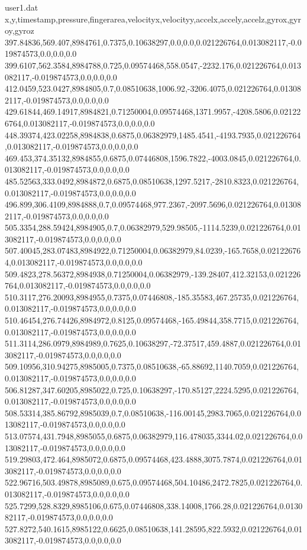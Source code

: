 \begin{filecontents}{user1.dat}
x,y,timestamp,pressure,fingerarea,velocityx,velocityy,accelx,accely,accelz,gyrox,gyroy,gyroz
397.84836,569.407,8984761,0.7375,0.10638297,0.0,0.0,0.021226764,0.013082117,-0.019874573,0.0,0.0,0.0
399.6107,562.3584,8984788,0.725,0.09574468,558.0547,-2232.176,0.021226764,0.013082117,-0.019874573,0.0,0.0,0.0
412.0459,523.0427,8984805,0.7,0.08510638,1006.92,-3206.4075,0.021226764,0.013082117,-0.019874573,0.0,0.0,0.0
429.61844,469.14917,8984821,0.71250004,0.09574468,1371.9957,-4208.5806,0.021226764,0.013082117,-0.019874573,0.0,0.0,0.0
448.39374,423.02258,8984838,0.6875,0.06382979,1485.4541,-4193.7935,0.021226764,0.013082117,-0.019874573,0.0,0.0,0.0
469.453,374.35132,8984855,0.6875,0.07446808,1596.7822,-4003.0845,0.021226764,0.013082117,-0.019874573,0.0,0.0,0.0
485.52563,333.0492,8984872,0.6875,0.08510638,1297.5217,-2810.8323,0.021226764,0.013082117,-0.019874573,0.0,0.0,0.0
496.899,306.4109,8984888,0.7,0.09574468,977.2367,-2097.5696,0.021226764,0.013082117,-0.019874573,0.0,0.0,0.0
505.3354,288.59424,8984905,0.7,0.06382979,529.98505,-1114.5239,0.021226764,0.013082117,-0.019874573,0.0,0.0,0.0
507.40045,283.07483,8984922,0.71250004,0.06382979,84.0239,-165.7658,0.021226764,0.013082117,-0.019874573,0.0,0.0,0.0
509.4823,278.56372,8984938,0.71250004,0.06382979,-139.28407,412.32153,0.021226764,0.013082117,-0.019874573,0.0,0.0,0.0
510.3117,276.20093,8984955,0.7375,0.07446808,-185.35583,467.25735,0.021226764,0.013082117,-0.019874573,0.0,0.0,0.0
510.46454,276.74426,8984972,0.8125,0.09574468,-165.49844,358.7715,0.021226764,0.013082117,-0.019874573,0.0,0.0,0.0
511.3114,286.0979,8984989,0.7625,0.10638297,-72.37517,459.4887,0.021226764,0.013082117,-0.019874573,0.0,0.0,0.0
509.10956,310.94275,8985005,0.7375,0.08510638,-65.88692,1140.7059,0.021226764,0.013082117,-0.019874573,0.0,0.0,0.0
506.81287,347.60205,8985022,0.725,0.10638297,-170.85127,2224.5295,0.021226764,0.013082117,-0.019874573,0.0,0.0,0.0
508.53314,385.86792,8985039,0.7,0.08510638,-116.00145,2983.7065,0.021226764,0.013082117,-0.019874573,0.0,0.0,0.0
513.07574,431.7948,8985055,0.6875,0.06382979,116.478035,3344.02,0.021226764,0.013082117,-0.019874573,0.0,0.0,0.0
519.29803,472.464,8985072,0.6875,0.09574468,423.4888,3075.7874,0.021226764,0.013082117,-0.019874573,0.0,0.0,0.0
522.96716,503.49878,8985089,0.675,0.09574468,504.10486,2472.7825,0.021226764,0.013082117,-0.019874573,0.0,0.0,0.0
525.7299,528.8329,8985106,0.675,0.07446808,338.14008,1766.28,0.021226764,0.013082117,-0.019874573,0.0,0.0,0.0
527.8272,540.1615,8985122,0.6625,0.08510638,141.28595,822.5932,0.021226764,0.013082117,-0.019874573,0.0,0.0,0.0

\end{filecontents}
